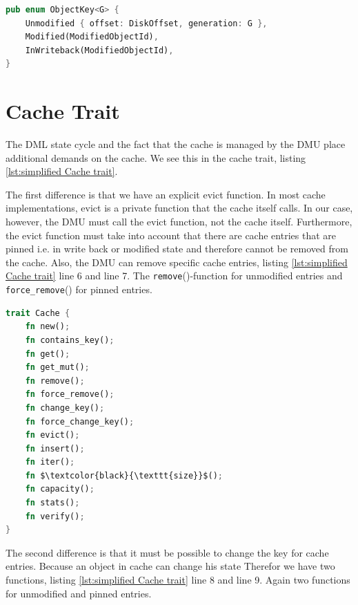 \documentclass[
	12pt,
	a4paper,
	abstract,
	bibliography=totoc,
	chapterprefix,
	headings=openright,
	numbers=endperiod,
	parskip=half,
	twoside,
]{scrreprt}
\begin{document}
\bigskip

\begin{lstlisting}[language=Rust,mathescape=true,caption=ObjectKey enumeration,label=lst:ObjectKey enumeration]
pub enum ObjectKey<G> {
    Unmodified { offset: DiskOffset, generation: G },
    Modified(ModifiedObjectId),
    InWriteback(ModifiedObjectId),
}
\end{lstlisting}

\bigskip

\section{Cache Trait}
\label{sec:cache trait}

The DML state cycle and the fact that the cache is managed by the DMU place additional demands on the cache.
We see this in the cache trait, listing \ref{lst:simplified Cache trait}.

The first difference is that we have an explicit evict function. In most cache implementations, evict is a private function that the cache itself calls.
In our case, however, the DMU must call the evict function, not the cache itself.
Furthermore, the evict function must take into account that there are cache entries that 
are pinned i.e. in write back or modified state and therefore cannot be removed from the cache.
Also, the DMU can remove specific cache entries, listing  \ref{lst:simplified Cache trait} line 6 and line 7.
The \texttt{remove}()-function for unmodified entries and \texttt{force\_remove}() for pinned entries.

\bigskip

\begin{lstlisting}[language=Rust,mathescape=true,caption={simplified Cache trait without type aliases, generics, function parameters and function return types},label=lst:simplified Cache trait]
trait Cache {
    fn new();
    fn contains_key();
    fn get();
    fn get_mut();
    fn remove();
    fn force_remove();
    fn change_key();
    fn force_change_key();
    fn evict();
    fn insert();
    fn iter();
    fn $\textcolor{black}{\texttt{size}}$();
    fn capacity();
    fn stats();
    fn verify();
}
\end{lstlisting}

The second difference is that it must be possible to change the key for cache entries.
Because an object in cache can change his state 
Therefor we have two functions, listing \ref{lst:simplified Cache trait} line 8 and line 9. 
Again two functions for unmodified and pinned entries.
\end{document}
